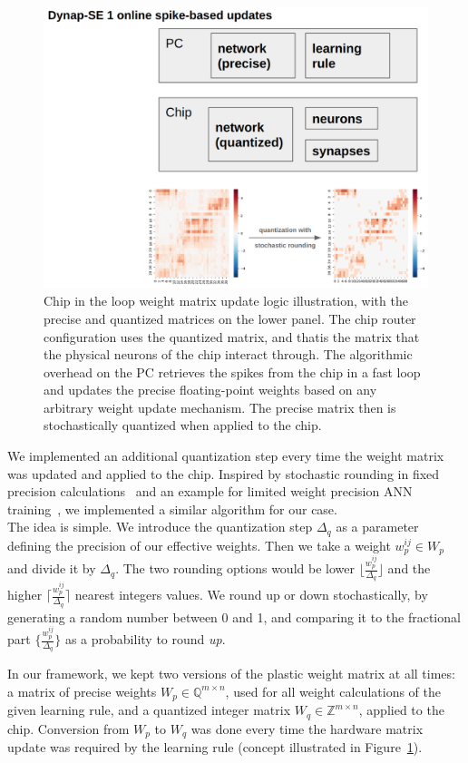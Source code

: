 \begin{figure}[b!]
  \centering
    \includegraphics[width=.7\textwidth]{img/chapter4/chip_in_the_loop_logic.png}
    \caption[Chip in the loop with storage of the precise and quantized versions of weight matrices.]{Chip in the loop weight matrix update logic illustration, with the precise and quantized matrices on the lower panel. The chip router configuration uses the quantized matrix, and thatis the matrix that the physical neurons of the chip interact through. The algorithmic overhead on the PC retrieves the spikes from the chip in a fast loop and updates the precise floating-point weights based on any arbitrary weight update mechanism. The precise matrix then is stochastically quantized when applied to the chip.}
  \label{fig:weight_quantization}
\end{figure}

We implemented an additional quantization step every time the weight matrix was updated and applied to the chip. Inspired by stochastic rounding in fixed precision calculations~\cite{Hopkins_etal20} and an example for limited weight precision ANN training~\cite{Gupta_etal15}, we implemented a similar algorithm for our case.\\

The idea is simple. We introduce the quantization step $\Delta_q$ as a parameter defining the precision of our effective weights. Then we take a weight $w^{ij}_p \in W_p$ and divide it by $\Delta_q$. The two rounding options would be lower $\lfloor \frac{w^{ij}_p}{\Delta_q}\rfloor$ and the higher $\lceil \frac{w^{ij}_p}{\Delta_q}\rceil$ nearest integers values. We round up or down stochastically, by generating a random number between 0 and 1, and comparing it to the fractional part $\{\frac{w^{ij}_p}{\Delta_q}\}$ as a probability to round \emph{up}.

In our framework, we kept two versions of the plastic weight matrix at all times: a matrix of precise weights $W_p \in \mathbb{Q}^{m \times n}$, used for all weight calculations of the given learning rule, and a quantized integer matrix $W_q \in \mathbb{Z}^{m \times n}$, applied to the chip. Conversion from $W_p$ to $W_q$ was done every time the hardware matrix update was required by the learning rule (concept illustrated in Figure~\ref{fig:weight_quantization}).


